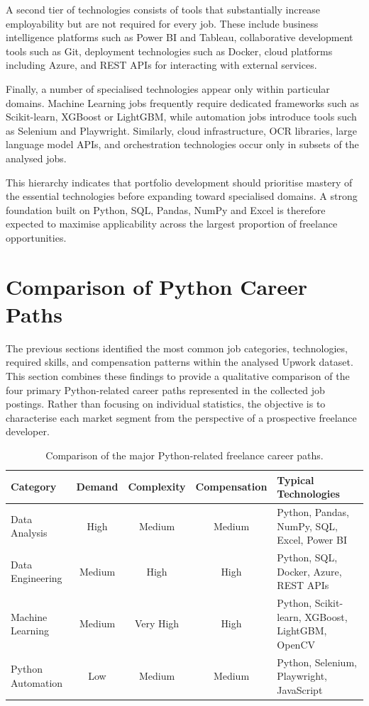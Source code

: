 A second tier of technologies consists of tools that substantially increase employability but are not required for every job. These include
business intelligence platforms such as Power BI and Tableau, collaborative development tools such as Git, deployment technologies such as Docker,
cloud platforms including Azure, and REST APIs for interacting with external services.

Finally, a number of specialised technologies appear only within particular domains. Machine Learning jobs frequently require dedicated frameworks such as
Scikit-learn, XGBoost or LightGBM, while automation jobs introduce tools such as Selenium and Playwright. Similarly, cloud infrastructure, OCR libraries,
large language model APIs, and orchestration technologies occur only in subsets of the analysed jobs.

This hierarchy indicates that portfolio development should prioritise mastery of the essential technologies before expanding toward specialised domains.
A strong foundation built on Python, SQL, Pandas, NumPy and Excel is therefore expected to maximise applicability across the largest proportion of freelance
opportunities.

\section{Comparison of Python Career Paths} 

The previous sections identified the most common job categories, technologies, required skills, and compensation patterns within the analysed Upwork dataset.
This section combines these findings to provide a qualitative comparison of the four primary Python-related career paths represented in the collected
job postings. Rather than focusing on individual statistics, the objective is to characterise each market segment from the perspective of a
prospective freelance developer.

\begin{table}[H]
\centering
\small
\caption{Comparison of the major Python-related freelance career paths.}
\label{tab:career_comparison}

\begin{tabularx}{\textwidth}{l c c c X}
\toprule
\textbf{Category} &
\textbf{Demand} &
\textbf{Complexity} &
\textbf{Compensation} &
\textbf{Typical Technologies} \\
\midrule

Data Analysis &
High &
Medium &
Medium &
Python, Pandas, NumPy, SQL, Excel, Power BI \\

Data Engineering &
Medium &
High &
High &
Python, SQL, Docker, Azure, REST APIs \\

Machine Learning &
Medium &
Very High &
High &
Python, Scikit-learn, XGBoost, LightGBM, OpenCV \\

Python Automation &
Low &
Medium &
Medium &
Python, Selenium, Playwright, JavaScript \\

\bottomrule
\end{tabularx}

\end{table}

